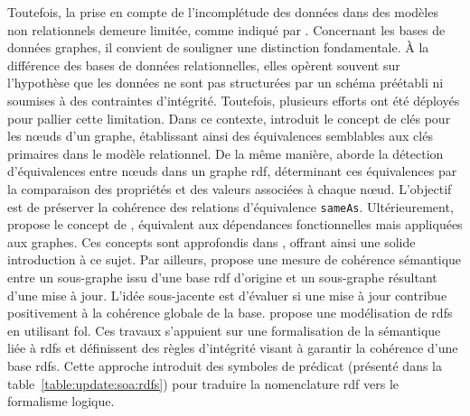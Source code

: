 Toutefois, la prise en compte de l'incomplétude des données dans des modèles non relationnels demeure limitée, comme indiqué par \cite{sirangeloRepresentingQueryingIncomplete2014}.
Concernant les bases de données graphes, il convient de souligner une distinction fondamentale.
À la différence des bases de données relationnelles, elles opèrent souvent sur l'hypothèse que les données ne sont pas structurées par un schéma préétabli ni soumises à des contraintes d'intégrité.
Toutefois, plusieurs efforts ont été déployés pour pallier cette limitation.
Dans ce contexte, \cite{fanKeysGraphs2015} introduit le concept de clés pour les nœuds d'un graphe, établissant ainsi des équivalences semblables aux clés primaires dans le modèle relationnel.
De la même manière, \cite{raadDetectionLiensIdentite2018} aborde la détection d'équivalences entre nœuds dans un graphe \gls{rdf}, déterminant ces équivalences par la comparaison des propriétés et des valeurs associées à chaque nœud.
L'objectif est de préserver la cohérence des relations d'équivalence \verb|sameAs|.
Ultérieurement, \cite{fanDependenciesGraphs2019} propose le concept de , équivalent aux dépendances fonctionnelles mais appliquées aux graphes.
Ces concepts sont approfondis dans \cite{anglesPgkeysKeysProperty2021,bonifatiQueryingGraphs2018}, offrant ainsi une solide introduction à ce sujet.
Par ailleurs, \cite{maillotConsistencyEvaluationRDF2014} propose une mesure de cohérence sémantique entre un sous-graphe issu d'une base \gls{rdf} d'origine et un sous-graphe résultant d'une mise à jour.
L'idée sous-jacente est d'évaluer si une mise à jour contribue positivement à la cohérence globale de la base.
\cite{flourisFormalFoundationsRDF2013} propose une modélisation de \gls{rdfs} en utilisant \gls{fol}.
Ces travaux s'appuient sur une formalisation de la sémantique liée à \gls{rdfs} et définissent des règles d'intégrité visant à garantir la cohérence d'une base \gls{rdfs}.
Cette approche introduit des symboles de prédicat (présenté dans la table~\ref{table:update:soa:rdfs}) pour traduire la nomenclature \gls{rdf} vers le formalisme logique.

